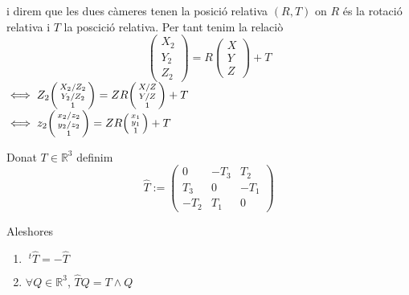 \documentclass[../main.tex]{subfiles}
\begin{document}
	i direm que les dues càmeres tenen la posició relativa $(R,T)$ on $R$ és la rotació relativa i $T$ la poscició relativa.
	Per tant tenim la relaciò
	\begin{displaymath}
		\begin{pmatrix}
			X_2\\Y_2\\Z_2
		\end{pmatrix} =
		R \begin{pmatrix}
			X\\Y\\Z
			\end{pmatrix}
		+ T
	\end{displaymath}
	$\iff Z_2\begin{psmallmatrix}X_2/Z_2\\Y_2/Z_2\\1\end{psmallmatrix} = ZR\begin{psmallmatrix}X/Z\\Y/Z\\1\end{psmallmatrix} + T$\\
	$\iff z_2\begin{psmallmatrix}x_2/z_2\\y_2/z_2\\1\end{psmallmatrix} = ZR\begin{psmallmatrix}x_1\\y_1\\1\end{psmallmatrix} + T$\\
	\begin{definicio}
		Donat $T \in \mathbb{R}^3$ definim
		\begin{displaymath}
			\hat{T} := \begin{pmatrix}
				0 & -T_3 & T_2\\
				T_3 & 0 & -T_1\\
				-T_2 & T_1 & 0
				\end{pmatrix}
		\end{displaymath}
	\end{definicio}
	Aleshores
	\begin{proposicio}
		\begin{enumerate}
			\item $\;^t\hat{T} = - \hat{T}$
			\item $\forall Q \in \mathbb{R}^3$, $\hat{T}Q = T \wedge Q$
		\end{enumerate}
	\end{proposicio}
\end{document}
